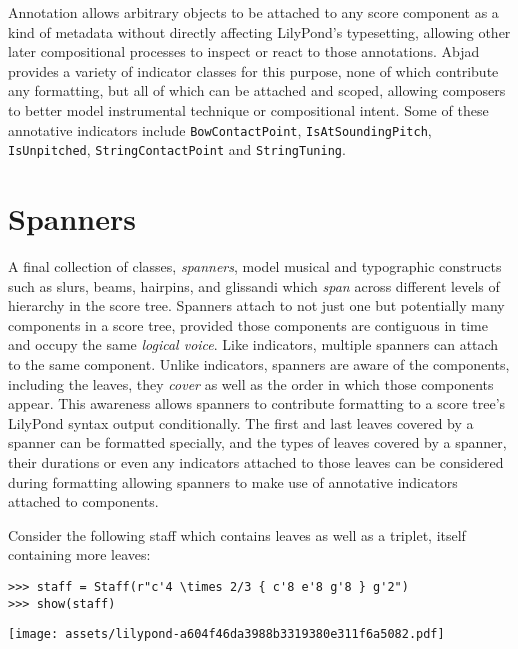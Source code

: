 \noindent Annotation allows arbitrary objects to be attached to any score
component as a kind of metadata without directly affecting LilyPond's
typesetting, allowing other later compositional processes to inspect or react
to those annotations. Abjad provides a variety of indicator classes for this
purpose, none of which contribute any formatting, but all of which can be
attached and scoped, allowing composers to better model instrumental technique
or compositional intent. Some of these annotative indicators include
\texttt{BowContactPoint}, \texttt{IsAtSoundingPitch}, \texttt{IsUnpitched},
\texttt{StringContactPoint} and \texttt{StringTuning}.

\section{Spanners}
\label{sec:spanners}

A final collection of classes, \emph{spanners}, model musical and typographic
constructs such as slurs, beams, hairpins, and glissandi which \emph{span}
across different levels of hierarchy in the score tree. Spanners attach to not
just one but potentially many components in a score tree, provided those
components are contiguous in time and occupy the same \emph{logical voice}.
Like indicators, multiple spanners can attach to the same component. Unlike
indicators, spanners are aware of the components, including the leaves, they
\emph{cover} as well as the order in which those components appear. This
awareness allows spanners to contribute formatting to a score tree's LilyPond
syntax output conditionally. The first and last leaves covered by a spanner can
be formatted specially, and the types of leaves covered by a spanner, their
durations or even any indicators attached to those leaves can be considered
during formatting allowing spanners to make use of annotative indicators
attached to components.

Consider the following staff which contains leaves as well as a triplet, itself
containing more leaves:

\begin{comment}
<abjad>
staff = Staff(r"c'4 \times 2/3 { c'8 e'8 g'8 } g'2")
show(staff)
</abjad>
\end{comment}

\begin{abjadbookoutput}
\begin{singlespacing}
\vspace{-0.5\baselineskip}
\begin{verbatim}
>>> staff = Staff(r"c'4 \times 2/3 { c'8 e'8 g'8 } g'2")
>>> show(staff)
\end{verbatim}
\noindent\texttt{[image: assets/lilypond-a604f46da3988b3319380e311f6a5082.pdf]}
\end{singlespacing}
\end{abjadbookoutput}

